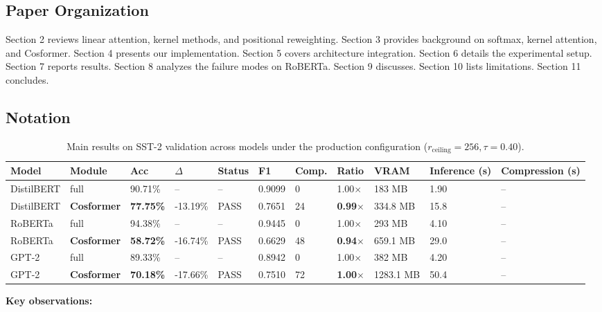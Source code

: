 \subsection{Paper Organization}

Section 2 reviews linear attention, kernel methods, and positional 
reweighting. Section 3 provides background on softmax, kernel attention, 
and Cosformer. Section 4 presents our implementation. Section 5 covers 
architecture integration. Section 6 details the experimental setup. 
Section 7 reports results. Section 8 analyzes the failure modes on 
RoBERTa. Section 9 discusses. Section 10 lists limitations. Section 11 
concludes.



\subsection{Notation}

\begin{table}[t]
\centering
\small
\begin{tabular}{lllllllllll}
\toprule
\textbf{Model} & \textbf{Module} & \textbf{Acc} & \textbf{$\Delta$} & \textbf{Status} & \textbf{F1} & \textbf{Comp.} & \textbf{Ratio} & \textbf{VRAM} & \textbf{Inference (s)} & \textbf{Compression (s)} \\
\midrule
DistilBERT & full & 90.71\% & -- & -- & 0.9099 & 0 & 1.00$\times$ & 183 MB & 1.90 & -- \\
DistilBERT & \textbf{Cosformer} & \textbf{77.75\%} & -13.19\% & PASS & 0.7651 & 24 & \textbf{0.99$\times$} & 334.8 MB & 15.8 & -- \\
RoBERTa & full & 94.38\% & -- & -- & 0.9445 & 0 & 1.00$\times$ & 293 MB & 4.10 & -- \\
RoBERTa & \textbf{Cosformer} & \textbf{58.72\%} & -16.74\% & PASS & 0.6629 & 48 & \textbf{0.94$\times$} & 659.1 MB & 29.0 & -- \\
GPT-2 & full & 89.33\% & -- & -- & 0.8942 & 0 & 1.00$\times$ & 382 MB & 4.20 & -- \\
GPT-2 & \textbf{Cosformer} & \textbf{70.18\%} & -17.66\% & PASS & 0.7510 & 72 & \textbf{1.00$\times$} & 1283.1 MB & 50.4 & -- \\
\bottomrule
\end{tabular}
\caption{Main results on SST-2 validation across models under the production configuration ($r_{\mathrm{ceiling}}=256, \tau=0.40$).}
\label{tab:main_sst2}
\end{table}

\textbf{Key observations:}

